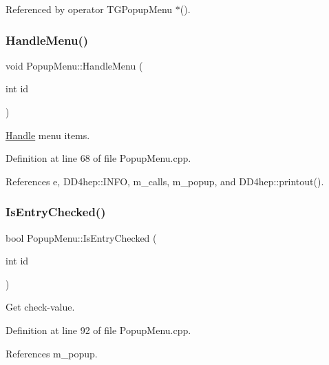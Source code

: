 Referenced by operator T\+G\+Popup\+Menu $\ast$().

\hypertarget{class_d_d4hep_1_1_popup_menu_a8f5895d41102d89191fae441522cc53c}{}\label{class_d_d4hep_1_1_popup_menu_a8f5895d41102d89191fae441522cc53c} 
\subsubsection{\texorpdfstring{Handle\+Menu()}{HandleMenu()}}
{\footnotesize\ttfamily void Popup\+Menu\+::\+Handle\+Menu (\begin{DoxyParamCaption}\item[{int}]{id }\end{DoxyParamCaption})}



\hyperlink{class_d_d4hep_1_1_handle}{Handle} menu items. 



Definition at line 68 of file Popup\+Menu.\+cpp.



References e, D\+D4hep\+::\+I\+N\+FO, m\+\_\+calls, m\+\_\+popup, and D\+D4hep\+::printout().

\hypertarget{class_d_d4hep_1_1_popup_menu_ae1fcd8933b7dbff53327cfb1f13d00d4}{}\label{class_d_d4hep_1_1_popup_menu_ae1fcd8933b7dbff53327cfb1f13d00d4} 
\subsubsection{\texorpdfstring{Is\+Entry\+Checked()}{IsEntryChecked()}}
{\footnotesize\ttfamily bool Popup\+Menu\+::\+Is\+Entry\+Checked (\begin{DoxyParamCaption}\item[{int}]{id }\end{DoxyParamCaption})}



Get check-\/value. 



Definition at line 92 of file Popup\+Menu.\+cpp.



References m\+\_\+popup.



